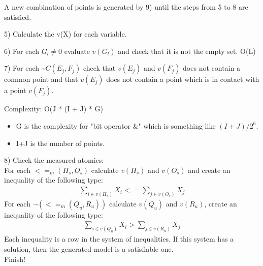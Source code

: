 \documentclass{article}
\begin{document}
			A new combination of points is generated by 9) until the steps from 5 to 8 are satisfied.
			\newline

			5) Calculate the v(X) for each variable. %
			\newline

			6) For each $G_l \neq 0$ evaluate $v(G_l)$ and check that it is not the empty set. O(L)
			\newline

			7) For each \textasciitilde $C(E_j, F_j)$ check that $v(E_j)$ and $v(F_j)$ does not contain a common point and that $v(E_j)$ does not contain a point which is in contact with a point $v(F_j)$.
			\newline

			Complexity: O(J * (I + J) * G)
			\begin{itemize}
				\item G is the complexity for "bit operator \&" which is something like $(I+J)/2^6$.
				\item I+J is the number of points.
			\end{itemize}
			
			8) Check the measured atomics: \\%

			For each $<=_m(H_s, O_s)$ calculate $v(H_s)$ and $v(O_s)$ and create an inequality of the following type: 
			\begin{align*}
				\sum_{i \in v(H_s)} X_i <= \sum_{j \in v(O_s)} X_j
			\end{align*}
			For each $\neg (<=_m(Q_u, R_u) )$ calculate $v(Q_u)$ and $v(R_u)$, create an inequality of the following type: 
			\begin{align*}
				\sum_{i \in v(Q_u)} X_i > \sum_{j \in v(R_u)} X_j
			\end{align*}
			Each inequality is a row in the system of inequalities. 
			If this system has a solution, then the generated model is a satisfiable one. \\ %
			
			Finish!
			\newline
\end{document}
